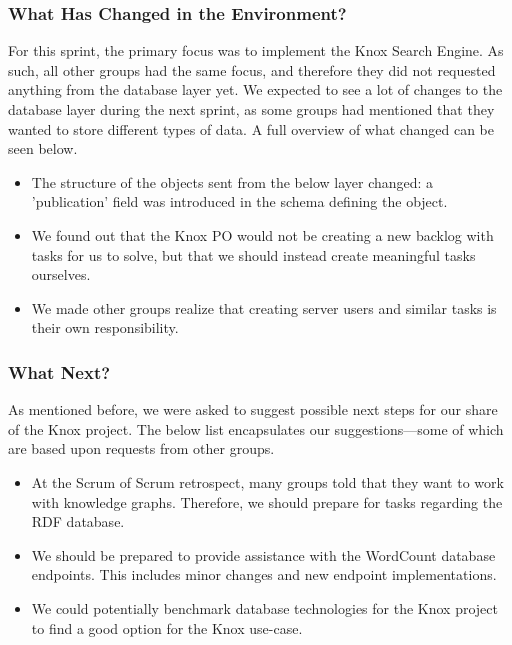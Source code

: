 \subsubsection{What Has Changed in the Environment?}
For this sprint, the primary focus was to implement the Knox Search Engine. As such, all other groups had the same focus, and therefore they did not requested anything from the database layer yet. 
We expected to see a lot of changes to the database layer during the next sprint, as some groups had mentioned that they wanted to store different types of data.
A full overview of what changed can be seen below.

\begin{itemize}
    \item The structure of the objects sent from the below layer changed: a 'publication' field was introduced in the schema defining the object.
    \item We found out that the Knox PO would not be creating a new backlog with tasks for us to solve, but that we should instead create meaningful tasks ourselves.
    \item We made other groups realize that creating server users and similar tasks is their own responsibility.
\end{itemize}

\subsubsection{What Next?}
As mentioned before, we were asked to suggest possible next steps for our share of the Knox project. The below list encapsulates our suggestions---some of which are based upon requests from other groups.

\begin{itemize}
    \item At the Scrum of Scrum retrospect, many groups told that they want to work with knowledge graphs. Therefore, we should prepare for tasks regarding the RDF database.
    \item We should be prepared to provide assistance with the WordCount database endpoints. This includes minor changes and new endpoint implementations.
    \item We could potentially benchmark database technologies for the Knox project to find a good option for the Knox use-case.
\end{itemize}